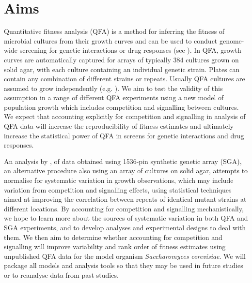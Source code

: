 \section{Aims}
\label{sec:aims}
Quantitative fitness analysis (QFA) is a method for inferring the
fitness of microbial cultures from their growth curves and can be used
to conduct genome-wide screening for genetic interactions or drug
responses (see
\citet{Addinall2008,Addinall2011,Lawless2010,Banks2012,Andrew2013}). In
QFA, growth curves are automatically captured for arrays of typically
384 cultures grown on solid agar, with each culture containing an
individual genetic strain. Plates can contain any combination of
different strains or repeats. %
Usually QFA cultures are assumed to grow independently
(e.g. \citet{Addinall2011}). We aim to test the validity of this
assumption in a range of different QFA experiments using a new model
of population growth which includes competition and signalling between
cultures. We expect that accounting explicitly for competition and
signalling in analysis of QFA data will increase the reproducibility
of fitness estimates and ultimately increase the statistical power of
QFA in screens for genetic interactions and drug responses.

An analysis by \citet{Baryshnikova2010}, of data obtained using
1536-pin synthetic genetic array (SGA), an alternative procedure also
using an array of cultures on solid agar, attempts to normalise for
systematic variation in growth observations, which may include
variation from competition and signalling effects, using statistical
techniques aimed at improving the correlation between repeats of
identical mutant strains at different locations. By accounting for
competition and signalling mechanistically, we hope to learn more
about the sources of systematic variation in both QFA and SGA
experiments, and to develop analyses and experimental designs to deal
with them. We then aim to determine whether accounting for competition
and signalling will improve variability and rank order of fitness
estimates using unpublished QFA data for the model organism
\textit{Saccharomyces cerevisiae}. We will package all models and
analysis tools so that they may be used in future studies or to
reanalyse data from past studies.

